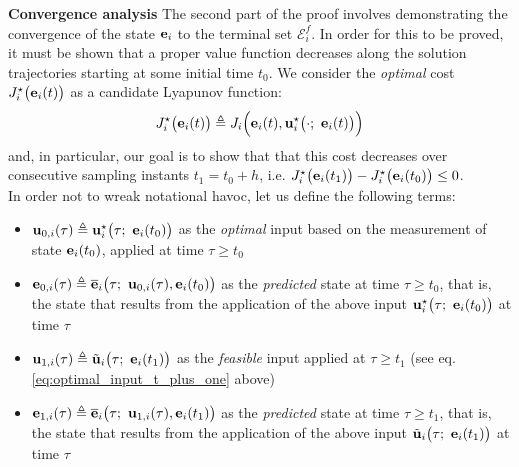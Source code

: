 \textbf{Convergence analysis}
The second part of the proof involves demonstrating the convergence of the
state $\bm{\mathbf{e}}_i$ to the terminal set $\mathcal{E}_i^f$. In order for this
to be proved, it must be shown that a proper value function decreases along
the solution trajectories starting at some initial time $t_0$. We consider the
\textit{optimal} cost $J_i^{\star}\big(\bm{\mathbf{e}}_i(t)\big)$ as a candidate
Lyapunov function:
$$J_i^{\star}\big(\vect{e}_i(t)\big) \triangleq J_i \Big(\vect{e}_i(t), \vect{u}_i^{\star}\big(\cdot;\ \vect{e}_i(t)\big)\Big)$$
and, in particular, our goal is to show that that this cost decreases over
consecutive sampling instants $t_1 = t_0 + h$, i.e.
$J_i^{\star}\big(\bm{\mathbf{e}}_i(t_1)\big) - J_i^{\star}\big(\bm{\mathbf{e}}_i(t_0)\big) \leq 0$.\\

In order not to wreak notational havoc, let us define the following terms:
\begin{itemize}
  \item $\bm{\mathbf{u}}_{0,i}(\tau) \triangleq \bm{\mathbf{u}}_i^{\star}\big(\tau;\ \bm{\mathbf{e}}_i(t_0)\big)$
    as the \textit{optimal} input based on the measurement of state
    $\bm{\mathbf{e}}_i(t_0)$, applied at time $\tau \geq t_0$
  \item $\bm{\mathbf{e}}_{0,i}(\tau) \triangleq \overline{\bm{\mathbf{e}}}_i\big(\tau;\ \bm{\mathbf{u}}_{0,i}(\tau), \bm{\mathbf{e}}_i(t_0)\big)$
    as the \textit{predicted} state at time $\tau \geq t_0$, that is,
    the state that results from the application of the above input
    $\vect{u}_i^{\star}\big(\tau;\ \vect{e}_i(t_0)\big)$ at time $\tau$
  \item $\bm{\mathbf{u}}_{1,i}(\tau) \triangleq \tilde{\bm{\mathbf{u}}}_i\big(\tau;\ \bm{\mathbf{e}}_i(t_1)\big)$
    as the \textit{feasible} input applied at $\tau \geq t_1$ (see eq. \eqref{eq:optimal_input_t_plus_one} above)
  \item $\bm{\mathbf{e}}_{1,i}(\tau) \triangleq \overline{\bm{\mathbf{e}}}_i\big(\tau;\ \bm{\mathbf{u}}_{1,i}(\tau), \bm{\mathbf{e}}_i(t_1)\big)$
    as the \textit{predicted} state at time $\tau \geq t_1$, that is,
    the state that results from the application of the above input
    $\tilde{\vect{u}}_i\big(\tau;\ \vect{e}_i(t_1)\big)$ at time $\tau$
\end{itemize}
